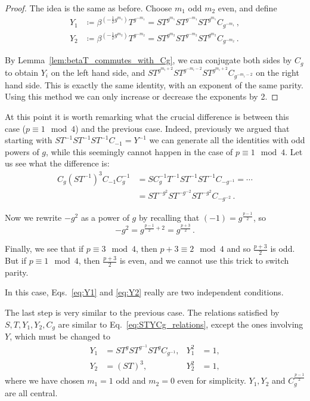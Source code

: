 \documentclass[aps,twocolumn,prx,floatfix,preprintnumbers, nofootinbib,10pt]{revtex4-2}
\numberwithin{equation}{section}
\theoremstyle{definition}
\theoremstyle{remark}
\theoremstyle{claim}
\newcommand{\be}{\begin{equation}}
\newcommand{\ee}{\end{equation}}
\begin{document}
\begin{proof}
 The idea is the same as before. Choose $m_1$ odd $m_2$ even, and define
 \begin{align}
  Y_1 &\coloneqq \beta^{(- \frac{1}{2} g^{m_1})} T^{g^{-m_1}} = S T^{g^{m_1}} S T^{g^{-m_1}} S T^{g^{m_1}} C_{g^{-m_1}} \,, \label{eq:Y1} \\
  Y_2 &\coloneqq \beta^{(- \frac{1}{2} g^{m_2})} T^{g^{-m_2}} = S T^{g^{m_2}} S T^{g^{-m_2}} S T^{g^{m_2}} C_{g^{-m_2}} \,. \label{eq:Y2}
 \end{align}

 By Lemma~\ref{lem:betaT_commutes_with_Cg}, we can conjugate both sides by $C_g$ to obtain $Y_i$ on the left hand side, and $S T^{g^{m_i + 2}} S T^{g^{-m_i - 2}} S T^{g^{m_i + 2}} C_{g^{-m_i - 2}}$ on the right hand side. This is exactly the same identity, with an exponent of the same parity. Using this method we can only increase or decrease the exponents by 2.
\end{proof}

At this point it is worth remarking what the crucial difference is between this case ($p \equiv 1 \mod 4$) and the previous case. Indeed, previously we argued that starting with $ST^{-1} ST^{-1} ST^{-1} C_{-1} = Y^{-1}$ we can generate all the identities with odd powers of $g$, while this seemingly cannot happen in the case of $p \equiv 1 \mod 4$. Let us see what the difference is:
\begin{align}
 C_g (S T^{-1})^3 C_{-1} C_g^{-1} &= S C_g^{-1} T^{-1} S T^{-1} S T^{-1} C_{-g^{-1}} = \cdots \nonumber \\
 &= S T^{-g^2} S T^{-g^{-2}} S T^{-g^2} C_{- g^{-2}} \,.
\end{align}

Now we rewrite $-g^2$ as a power of $g$ by recalling that $(-1) = g^{\frac{p-1}{2}}$, so
\be
-g^2 = g^{\frac{p-1}{2} + 2} = g^{\frac{p+3}{2}} \,.
\ee

Finally, we see that if $p \equiv 3 \mod 4$, then $p + 3 \equiv 2 \mod 4$ and so $\frac{p + 3}{2}$ is odd. But if $p \equiv 1 \mod 4$, then $\frac{p + 3}{2}$ is even, and we cannot use this trick to switch parity.

In this case, Eqs.~\eqref{eq:Y1} and \eqref{eq:Y2} really are two independent conditions.

The last step is very similar to the previous case. The relations satisfied by $S, T, Y_1, Y_2, C_g$ are similar to Eq.~\eqref{eq:STYCg_relations}, except the ones involving $Y$, which must be changed to
\begin{align}
 Y_1 &= S T^{g} S T^{g^{-1}} S T^{g} C_{g^{-1}}, & Y_1^2 &= 1,  \\
  Y_2 &= (ST)^3, & Y_2^2 &= 1,
\end{align}
where we have chosen $m_1 = 1$ odd and $m_2 = 0$ even for simplicity. $Y_1, Y_2$ and $C_g^{\frac{p-1}{2}}$ are all central.
\end{document}
